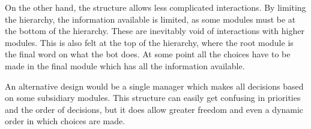 On the other hand, the structure allows less complicated interactions. By limiting the hierarchy, the information available is limited, as some modules must be at the bottom of the hierarchy. These are inevitably void of interactions with higher modules. This is also felt at the top of the hierarchy, where the root module is the final word on what the bot does. At some point all the choices have to be made in the final module which has all the information available.

An alternative design would be a single manager which makes all decisions based on some subsidiary modules. This structure can easily get confusing in priorities and the order of decisions, but it does allow greater freedom and even a dynamic order in which choices are made.
